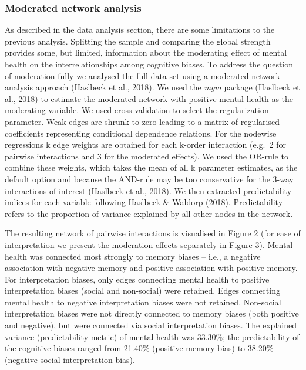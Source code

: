 \documentclass[man,floatsintext]{apa6}
\begin{document}
\hypertarget{moderated-network-analysis}{%
\subsubsection{Moderated network analysis}\label{moderated-network-analysis}}

As described in the data analysis section, there are some limitations to the previous analysis. Splitting the sample and comparing the global strength provides some, but limited, information about the moderating effect of mental health on the interrelationships among cognitive biases. To address the question of moderation fully we analysed the full data set using a moderated network analysis approach (Haslbeck et al., 2018). We used the \emph{mgm} package (Haslbeck et al., 2018) to estimate the moderated network with positive mental health as the moderating variable. We used cross-validation to select the regularization parameter. Weak edges are shrunk to zero leading to a matrix of regularised coefficients representing conditional dependence relations. For the nodewise regressions k edge weights are obtained for each k-order interaction (e.g.~2 for pairwise interactions and 3 for the moderated effects). We used the OR-rule to combine these weights, which takes the mean of all k parameter estimates, as the default option and because the AND-rule may be too conservative for the 3-way interactions of interest (Haslbeck et al., 2018). We then extracted predictability indices for each variable following Haslbeck \& Waldorp (2018). Predictability refers to the proportion of variance explained by all other nodes in the network.

The resulting network of pairwise interactions is visualised in Figure 2 (for ease of interpretation we present the moderation effects separately in Figure 3). Mental health was connected most strongly to memory biases -- i.e., a negative association with negative memory and positive association with positive memory. For interpretation biases, only edges connecting mental health to positive interpretation biases (social and non-social) were retained. Edges connecting mental health to negative interpretation biases were not retained. Non-social interpretation biases were not directly connected to memory biases (both positive and negative), but were connected via social interpretation biases. The explained variance (predictability metric) of mental health was 33.30\%; the predictability of the cognitive biases ranged from 21.40\% (positive memory bias) to 38.20\% (negative social interpretation bias).
\end{document}
